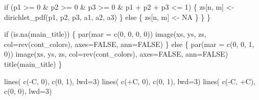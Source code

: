 \documentclass[
  letterpaper,
  DIV=11,
  numbers=noendperiod]{scrartcl}
\newenvironment{Shaded}{\begin{snugshade}}{\end{snugshade}}
\newcommand{\AttributeTok}[1]{\textcolor[rgb]{0.40,0.45,0.13}{#1}}
\newcommand{\ConstantTok}[1]{\textcolor[rgb]{0.56,0.35,0.01}{#1}}
\newcommand{\ControlFlowTok}[1]{\textcolor[rgb]{0.00,0.23,0.31}{#1}}
\newcommand{\DecValTok}[1]{\textcolor[rgb]{0.68,0.00,0.00}{#1}}
\newcommand{\FunctionTok}[1]{\textcolor[rgb]{0.28,0.35,0.67}{#1}}
\newcommand{\NormalTok}[1]{\textcolor[rgb]{0.00,0.23,0.31}{#1}}
\newcommand{\OtherTok}[1]{\textcolor[rgb]{0.00,0.23,0.31}{#1}}
\newcommand{\SpecialCharTok}[1]{\textcolor[rgb]{0.37,0.37,0.37}{#1}}
\begin{document}
\begin{Shaded}
\begin{Highlighting}[]
      \ControlFlowTok{if}\NormalTok{ (p1 }\SpecialCharTok{\textgreater{}=} \DecValTok{0} \SpecialCharTok{\&}\NormalTok{ p2 }\SpecialCharTok{\textgreater{}=} \DecValTok{0} \SpecialCharTok{\&}\NormalTok{ p3 }\SpecialCharTok{\textgreater{}=} \DecValTok{0} \SpecialCharTok{\&}\NormalTok{ p1 }\SpecialCharTok{+}\NormalTok{ p2 }\SpecialCharTok{+}\NormalTok{ p3 }\SpecialCharTok{\textless{}=} \DecValTok{1}\NormalTok{) \{}
\NormalTok{        zs[n, m] }\OtherTok{\textless{}{-}} \FunctionTok{dirichlet\_pdf}\NormalTok{(p1, p2, p3, a1, a2, a3)}
\NormalTok{      \} }\ControlFlowTok{else}\NormalTok{ \{}
\NormalTok{        zs[n, m] }\OtherTok{\textless{}{-}} \ConstantTok{NA}
\NormalTok{      \}}
\NormalTok{    \}}
\NormalTok{  \}}

  \ControlFlowTok{if}\NormalTok{ (}\FunctionTok{is.na}\NormalTok{(main\_title)) \{}
    \FunctionTok{par}\NormalTok{(}\AttributeTok{mar =} \FunctionTok{c}\NormalTok{(}\DecValTok{0}\NormalTok{, }\DecValTok{0}\NormalTok{, }\DecValTok{0}\NormalTok{, }\DecValTok{0}\NormalTok{))}
    \FunctionTok{image}\NormalTok{(xs, ys, zs, }\AttributeTok{col=}\FunctionTok{rev}\NormalTok{(cont\_colors), }\AttributeTok{axes=}\ConstantTok{FALSE}\NormalTok{, }\AttributeTok{ann=}\ConstantTok{FALSE}\NormalTok{)}
\NormalTok{  \} }\ControlFlowTok{else}\NormalTok{ \{}
    \FunctionTok{par}\NormalTok{(}\AttributeTok{mar =} \FunctionTok{c}\NormalTok{(}\DecValTok{0}\NormalTok{, }\DecValTok{0}\NormalTok{, }\DecValTok{1}\NormalTok{, }\DecValTok{0}\NormalTok{))}
    \FunctionTok{image}\NormalTok{(xs, ys, zs, }\AttributeTok{col=}\FunctionTok{rev}\NormalTok{(cont\_colors), }\AttributeTok{axes=}\ConstantTok{FALSE}\NormalTok{, }\AttributeTok{ann=}\ConstantTok{FALSE}\NormalTok{)}
    \FunctionTok{title}\NormalTok{(main\_title)}
\NormalTok{  \}}

  \FunctionTok{lines}\NormalTok{( }\FunctionTok{c}\NormalTok{(}\SpecialCharTok{{-}}\NormalTok{C, }\DecValTok{0}\NormalTok{), }\FunctionTok{c}\NormalTok{(}\DecValTok{0}\NormalTok{, }\DecValTok{1}\NormalTok{), }\AttributeTok{lwd=}\DecValTok{3}\NormalTok{)}
  \FunctionTok{lines}\NormalTok{( }\FunctionTok{c}\NormalTok{(}\SpecialCharTok{+}\NormalTok{C, }\DecValTok{0}\NormalTok{), }\FunctionTok{c}\NormalTok{(}\DecValTok{0}\NormalTok{, }\DecValTok{1}\NormalTok{), }\AttributeTok{lwd=}\DecValTok{3}\NormalTok{)}
  \FunctionTok{lines}\NormalTok{( }\FunctionTok{c}\NormalTok{(}\SpecialCharTok{{-}}\NormalTok{C, }\SpecialCharTok{+}\NormalTok{C), }\FunctionTok{c}\NormalTok{(}\DecValTok{0}\NormalTok{, }\DecValTok{0}\NormalTok{), }\AttributeTok{lwd=}\DecValTok{3}\NormalTok{)}


\end{Highlighting}
\end{Shaded}
\end{document}
